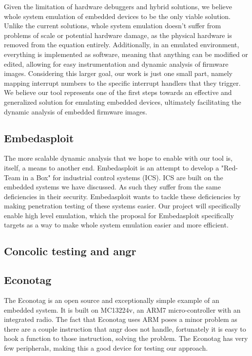 \documentclass[letterpaper, 10 pt, conference]{ieeeconf}
\begin{document}
Given the limitation of hardware debuggers and hybrid solutions, we believe whole system emulation of embedded devices to be the only viable solution. Unlike the current solutions, whole system emulation doesn't suffer from problems of scale or potential hardware damage, as the physical hardware is removed from the equation entirely. Additionally, in an emulated environment, everything is implemented as software, meaning that anything can be modified or edited, allowing for easy instrumentation and dynamic analysis of firmware images. Considering this larger goal, our work is just one small part, namely mapping interrupt numbers to the specific interrupt handlers that they trigger. We believe our tool represents one of the first steps towards an effective and generalized solution for emulating embedded devices, ultimately facilitating the dynamic analysis of embedded firmware images.

\subsection{Embedasploit}
The more scalable dynamic analysis that we hope to enable with our tool is, itself, a means to another end. Embedasploit is an attempt to develop a "Red-Team in a Box" for industrial control systems (ICS). ICS are built on the embedded systems we have discussed. As such they suffer from the same deficiencies in their security. Embedasploit wants to tackle these deficiencies by making penetration testing of these systems easier. Our project will specifically enable high level emulation, which the proposal for Embedasploit specifically targets as a way to make whole system emulation easier and more efficient.

\subsection{Concolic testing and angr}


\subsection{Econotag}
The Econotag is an open source and exceptionally simple example of an embedded system. It is built on MC13224v, an ARM7 micro-controller with an integrated radio. The fact that Econotag uses ARM poses a minor problem as there are a couple instruction that angr does not handle, fortunately it is easy to hook a function to those instruction, solving the problem. The Econotag has very few peripherals, making this a good device for testing our approach.
\end{document}

